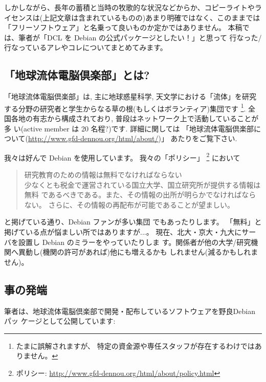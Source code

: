 \documentclass[mingoth,a4paper,twoside]{jsarticle}
\begin{document}
しかしながら、長年の蓄積と当時の牧歌的な状況などからか、コピーライトやラ
イセンスは(上記文章は含まれているものの)あまり明確ではなく、このままでは
「フリーソフトウェア」と名乗って良いものか定かではありません。
%
本稿では、筆者が「DCL を Debian の公式パッケージとしたい！」と思って
行なった/行なっているアレやコレについてまとめてみます。

\subsection{%
  「地球流体電脳倶楽部」とは?
}

「地球流体電脳倶楽部」は, 主に地球惑星科学, 天文学における「流体」を研究
する分野の研究者と学生からなる草の根(もしくはボランティア)集団です
\footnote{%
  たまに誤解されますが、
  特定の資金源や専任スタッフが存在するわけではありません。%
}.
全国各地の有志から構成されており, 普段はネットワーク上で活動していることが多
い(active member は 20 名程?)です.
%
詳細に関しては
「地球流体電脳倶楽部について(\url{http://www.gfd-dennou.org/html/about/})」
あたりをご覧下さい.

我々は好んで Debian を使用しています。
%
我々の「ポリシー」%
\footnote{ポリシー: \url{http://www.gfd-dennou.org/html/about/policy.html}}
において
\begin{quote}
  研究教育のための情報は無料でなければならない　\\
  少なくとも税金で運営されている国立大学、国立研究所が提供する情報は無料
  であるべきである。また、その情報の出所が明らかでなければならない。
  さらに、その情報の再配布が可能であることが望ましい。
\end{quote}
と掲げている通り、Debian ファンが多い集団
でもあったりします。
「無料」と掲げている点が悩ましい所ではありますが...。
%
現在、北大・京大・九大にサーバを設置し Debian のミラーをやっていたりしま
す。関係者が他の大学/研究機関へ異動し(機関の許可があれば)他にも増えるかも
しれません(減るかもしれません)。

\subsection{%
  事の発端
}

筆者は、地球流体電脳倶楽部で開発・配布しているソフトウェアを野良Debianパッ
ケージとして公開しています:
\end{document}
